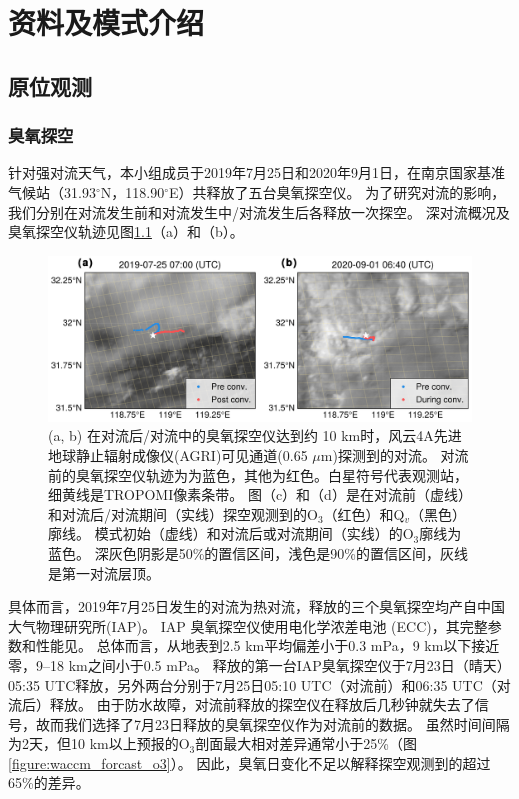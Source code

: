
\chapter{资料及模式介绍}

\section{原位观测}

\subsection{臭氧探空}

针对强对流天气，本小组成员于2019年7月25日和2020年9月1日，在南京国家基准气候站（31.93$^{\circ}$N，118.90$^{\circ}$E）共释放了五台臭氧探空仪。
为了研究对流的影响，我们分别在对流发生前和对流发生中/对流发生后各释放一次探空。
深对流概况及臭氧探空仪轨迹见图\ref{figure:ozonesonde}（a）和（b）。

\begin{figure}[htbp]
\centering
\includegraphics[width=35em]{./figures/ozonesonde.png}
\caption{(a, b) 在对流后/对流中的臭氧探空仪达到约 10 km时，风云4A先进地球静止辐射成像仪(AGRI)可见通道(0.65 $\mu$m)探测到的对流。
对流前的臭氧探空仪轨迹为为蓝色，其他为红色。白星符号代表观测站，细黄线是TROPOMI像素条带。
图（c）和（d）是在对流前（虚线）和对流后/对流期间（实线）探空观测到的O$_3$（红色）和Q$_v$（黑色）廓线。
模式初始（虚线）和对流后或对流期间（实线）的O$_3$廓线为蓝色。
深灰色阴影是50\%的置信区间，浅色是90\%的置信区间，灰线是第一对流层顶。}
\label{figure:ozonesonde}
\end{figure}


具体而言，2019年7月25日发生的对流为热对流，释放的三个臭氧探空均产自中国大气物理研究所(IAP)。
IAP 臭氧探空仪使用电化学浓差电池 (ECC)，其完整参数和性能见\citet{Zhang.2014}。
总体而言，从地表到2.5 km平均偏差小于0.3 mPa，9 km以下接近零，9--18 km之间小于0.5 mPa。
释放的第一台IAP臭氧探空仪于7月23日（晴天）05:35 UTC释放，另外两台分别于7月25日05:10 UTC（对流前）和06:35 UTC（对流后）释放。
由于防水故障，对流前释放的探空仪在释放后几秒钟就失去了信号，故而我们选择了7月23日释放的臭氧探空仪作为对流前的数据。
虽然时间间隔为2天，但10 km以上预报的O$_3$剖面最大相对差异通常小于25\%（图\ref{figure:waccm_forcast_o3}）。
因此，臭氧日变化不足以解释探空观测到的超过65\%的差异。

